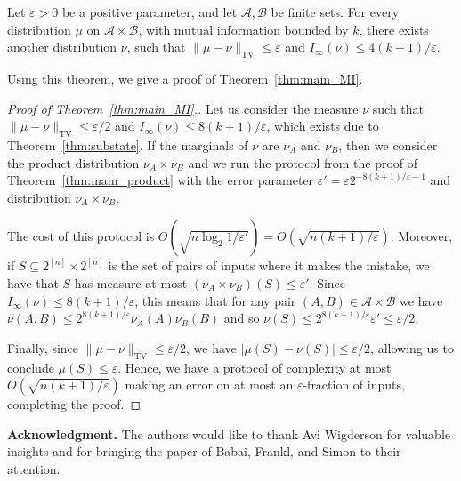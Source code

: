 \documentclass[11pt]{amsart}
\theoremstyle{definition}
\def\eps{\varepsilon}
\def\cA{\mathcal{A}}
\def\cB{\mathcal{B}}
\begin{document}
\begin{theorem}\label{thm:substate}
Let $\eps>0$ be a positive parameter, and let $\cA, \cB$ be finite sets. For every distribution $\mu$ on $\cA\times \cB$, with mutual information bounded by $k$, there exists another distribution $\nu$, such that $\|\mu-\nu\|_{\operatorname{TV}}\leq \eps$ and $I_{\infty}(\nu)\leq 4(k+1)/\eps$.
\end{theorem}

Using this theorem, we give a proof of Theorem~\ref{thm:main_MI}.

\begin{proof}[Proof of Theorem~\ref{thm:main_MI}.]
Let us consider the measure $\nu$ such that $\|\mu-\nu\|_{\operatorname{TV}}\leq \eps/2$ and $I_\infty(\nu)\leq 8(k+1)/\eps$, which exists due to Theorem~\ref{thm:substate}. If the marginals of $\nu$ are $\nu_A$ and $\nu_B$, then we consider the product distribution $\nu_A\times \nu_B$ and we run the protocol from the proof of Theorem~\ref{thm:main_product} with the error parameter $\eps'= \eps 2^{-8(k+1)/\eps-1}$ and distribution $\nu_A\times \nu_B$.

The cost of this protocol is $O(\sqrt{n\log_2 1/\eps'})=O(\sqrt{n(k+1)/\eps})$. Moreover, if $S\subseteq 2^{[n]}\times 2^{[n]}$ is the set of pairs of inputs where it makes the mistake, we have that $S$ has measure at most $(\nu_A\times \nu_B)(S)\leq \eps'$. Since $I_\infty(\nu)\leq 8(k+1)/\eps$, this means that for any pair $(A, B)\in \cA\times \cB$ we have $\nu(A, B)\leq 2^{8(k+1)/\eps}\nu_A(A)\nu_B(B)$ and so $\nu(S)\leq 2^{8(k+1)/\eps}\eps'\leq \eps/2$.

Finally, since $\|\mu-\nu\|_{\operatorname{TV}}\leq \eps/2$, we have $|\mu(S)-\nu(S)|\leq \eps/2$, allowing us to conclude $\mu(S)\leq \eps$. Hence, we have a protocol of complexity at most $O(\sqrt{n(k+1)/\eps})$ making an error on at most an $\eps$-fraction of inputs, completing the proof.
\end{proof}

\medskip
\noindent
{\bf Acknowledgment.} The authors would like to thank Avi Wigderson for valuable insights and for bringing the paper of Babai, Frankl, and Simon to their attention.


\end{document}
